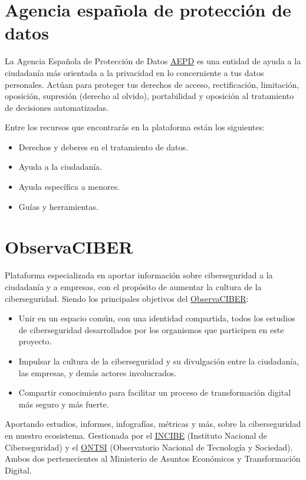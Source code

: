 \documentclass[
  a4paper,
  openany]{book}
\begin{document}
\hypertarget{agencia-espauxf1ola-de-protecciuxf3n-de-datos}{%
\section{Agencia española de protección de datos}\label{agencia-espauxf1ola-de-protecciuxf3n-de-datos}}

La Agencia Española de Protección de Datos \href{https://www.aepd.es/es}{AEPD} es una entidad de ayuda a la ciudadanía más orientada a la privacidad en lo concerniente a tus datos personales. Actúan para proteger tus derechos de acceso, rectificación, limitación, oposición, supresión (derecho al olvido), portabilidad y oposición al tratamiento de decisiones automatizadas.

Entre los recursos que encontrarás en la plataforma están los siguientes:

\begin{itemize}
\item
  Derechos y deberes en el tratamiento de datos.
\item
  Ayuda a la ciudadanía.
\item
  Ayuda específica a menores.
\item
  Guías y herramientas.
\end{itemize}

\hypertarget{observaciber}{%
\section{ObservaCIBER}\label{observaciber}}

Plataforma especializada en aportar información sobre ciberseguridad a la ciudadanía y a empresas, con el propósito de aumentar la cultura de la ciberseguridad. Siendo los principales objetivos del \href{https://observaciber.es/}{ObservaCIBER}:

\begin{itemize}
\item
  Unir en un espacio común, con una identidad compartida, todos los estudios de ciberseguridad desarrollados por los organismos que participen en este proyecto.
\item
  Impulsar la cultura de la ciberseguridad y su divulgación entre la ciudadanía, las empresas, y demás actores involucrados.
\item
  Compartir conocimiento para facilitar un proceso de transformación digital más seguro y más fuerte.
\end{itemize}

Aportando estudios, informes, infografías, métricas y más, sobre la ciberseguridad en nuestro ecosistema. Gestionada por el \href{https://www.incibe.es/}{INCIBE} (Instituto Nacional de Ciberseguridad) y el \href{https://www.ontsi.es/es}{ONTSI} (Observatorio Nacional de Tecnología y Sociedad). Ambos dos pertenecientes al Ministerio de Asuntos Económicos y Transformación Digital.
\end{document}
